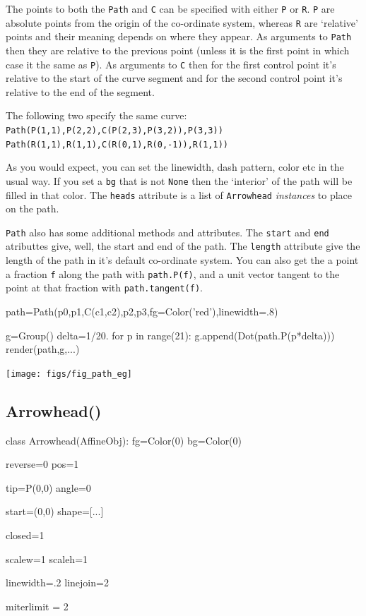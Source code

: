 \documentclass[a4paper]{book}
\begin{document}
The points to both the \Verb|Path| and \Verb|C| can be specified with
either \Verb|P| or \Verb|R|. \Verb|P| are absolute points from the
origin of the co-ordinate system, whereas \Verb|R| are `relative'
points and their meaning depends on where they appear. As arguments to
\Verb|Path| then they are relative to the previous point (unless it is
the first point in which case it the same as \Verb|P|). As arguments to
\Verb|C| then for the first control point it's relative to the start of the
curve segment and for the second control point it's relative to the
end of the segment.
\begin{example}
The following two specify the same curve:\\
\Verb|Path(P(1,1),P(2,2),C(P(2,3),P(3,2)),P(3,3))|\\
\Verb|Path(R(1,1),R(1,1),C(R(0,1),R(0,-1)),R(1,1))|
\end{example}

As you would expect, you can set the linewidth, dash pattern, color
etc in the usual way. If you set a \Verb|bg| that is not \Verb|None|
then the `interior' of the path will be filled in that color. 
The \Verb|heads| attribute is a list of \Verb|Arrowhead| \emph{instances}
to place on the path. 


\Verb|Path| also has some additional methods and attributes. The 
\Verb|start| and \Verb|end| atributtes give, well, the start and end of
the path. The \Verb|length| attribute give the length of the path
in it's default co-ordinate system. You can also get the a point a fraction
\Verb|f| along the path with \Verb|path.P(f)|, and a unit vector tangent 
to the point at that fraction with \Verb|path.tangent(f)|.
\begin{example}
\begin{python}
path=Path(p0,p1,C(c1,c2),p2,p3,fg=Color('red'),linewidth=.8)

g=Group()
delta=1/20.
for p in range(21):
    g.append(Dot(path.P(p*delta)))
render(path,g,...)
\end{python}
\begin{center}
  \texttt{[image: figs/fig\_path\_eg]}
\end{center}
\end{example}

\subsection{Arrowhead()}
\label{sec:arrowhead}
\begin{python}
class Arrowhead(AffineObj):
    fg=Color(0)
    bg=Color(0)

    reverse=0    
    pos=1

    tip=P(0,0)
    angle=0

    start=(0,0)
    shape=[...]

    closed=1

    scalew=1
    scaleh=1

    linewidth=.2
    linejoin=2 

    miterlimit = 2  

\end{python}
\end{document}
